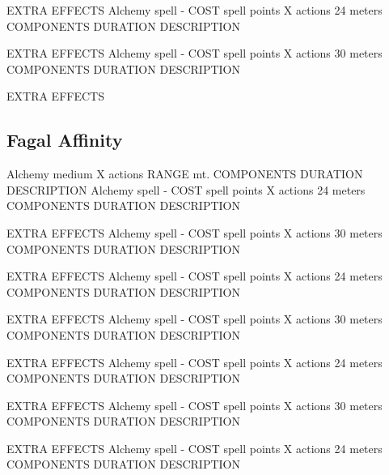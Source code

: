         EXTRA EFFECTS
        {Alchemy spell - COST spell points}
        {X actions}
        {24 meters}
        {COMPONENTS}
        {DURATION}
        DESCRIPTION

        EXTRA EFFECTS
        {Alchemy spell - COST spell points}
        {X actions}
        {30 meters}
        {COMPONENTS}
        {DURATION}
        DESCRIPTION

        EXTRA EFFECTS

\subsection*{Fagal Affinity}
        {Alchemy medium}
        {X actions}
        {RANGE mt.}
        {COMPONENTS}
        {DURATION}
        DESCRIPTION
        {Alchemy spell - COST spell points}
        {X actions}
        {24 meters}
        {COMPONENTS}
        {DURATION}
        DESCRIPTION

        EXTRA EFFECTS
        {Alchemy spell - COST spell points}
        {X actions}
        {30 meters}
        {COMPONENTS}
        {DURATION}
        DESCRIPTION

        EXTRA EFFECTS
        {Alchemy spell - COST spell points}
        {X actions}
        {24 meters}
        {COMPONENTS}
        {DURATION}
        DESCRIPTION

        EXTRA EFFECTS
        {Alchemy spell - COST spell points}
        {X actions}
        {30 meters}
        {COMPONENTS}
        {DURATION}
        DESCRIPTION

        EXTRA EFFECTS
        {Alchemy spell - COST spell points}
        {X actions}
        {24 meters}
        {COMPONENTS}
        {DURATION}
        DESCRIPTION

        EXTRA EFFECTS
        {Alchemy spell - COST spell points}
        {X actions}
        {30 meters}
        {COMPONENTS}
        {DURATION}
        DESCRIPTION

        EXTRA EFFECTS
        {Alchemy spell - COST spell points}
        {X actions}
        {24 meters}
        {COMPONENTS}
        {DURATION}
        DESCRIPTION

